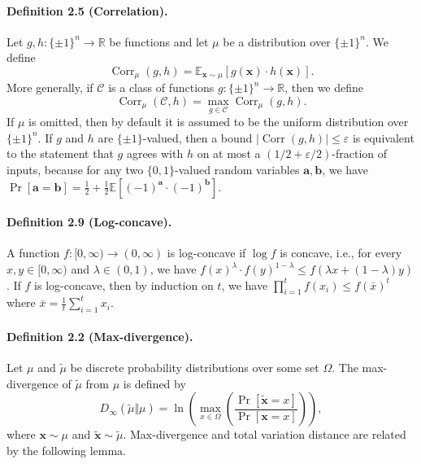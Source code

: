 \documentclass[10pt,a4paper]{article}
\newcommand{\Corr}{\operatorname{Corr}}
\begin{document}
\paragraph{Definition 2.5 (Correlation).} Let $g,h:\{\pm1\}^n\to\mathbb R$ be functions and let $\mu$ be a distribution over $\{\pm1\}^n$. We define
\[\Corr_\mu(g,h)=\mathbb E_{\mathbf x\sim\mu}[g(\mathbf x)\cdot h(\mathbf x)].\]
More generally, if $\mathcal C$ is a class of functions $g:\{\pm1\}^n\to\mathbb R$, then we define
\[\Corr_\mu(\mathcal C,h)=\max_{g\in\mathcal C}\Corr_\mu(g,h).\]
If $\mu$ is omitted, then by default it is assumed to be the uniform distribution over $\{\pm1\}^n$.
If $g$ and $h$ are $\{\pm1\}$-valued, then a bound $|\Corr(g,h)|\le\varepsilon$ is equivalent to the statement that $g$ agrees with $h$ on at most a $(1/2+\varepsilon/2)$-fraction of inputs, because for any two $\{0,1\}$-valued random variables $\mathbf a,\mathbf b$, we have $\Pr[\mathbf a=\mathbf b]=\frac12+\frac12\mathbb E[(-1)^{\mathbf a}\cdot(-1)^{\mathbf b}]$.
\paragraph{Definition 2.9 (Log-concave).} A function $f:[0,\infty)\to(0,\infty)$ is log-concave if $\log f$ is concave, i.e., for every $x,y\in[0,\infty)$ and $\lambda\in(0,1)$, we have $f(x)^\lambda\cdot f(y)^{1-\lambda}\le f(\lambda x+(1-\lambda)y)$.
If $f$ is log-concave, then by induction on $t$, we have $\prod_{i=1}^t f(x_i)\le f(\bar x)^t$ where $\bar x=\frac1t\sum_{i=1}^t x_i$.

\paragraph{Definition 2.2 (Max-divergence).} Let $\mu$ and $\widetilde\mu$ be discrete probability distributions over some set $\Omega$. The max-divergence of $\widetilde\mu$ from $\mu$ is defined by
\[D_\infty(\widetilde\mu\Vert\mu)=\ln\left(\max_{x\in\Omega}\left(\frac{\Pr[\widetilde{\mathbf x}=x]}{\Pr[\mathbf x=x]}\right)\right),\]
where $\mathbf x\sim\mu$ and $\widetilde{\mathbf x}\sim\widetilde\mu$.
Max-divergence and total variation distance are related by the following lemma.
\end{document}
